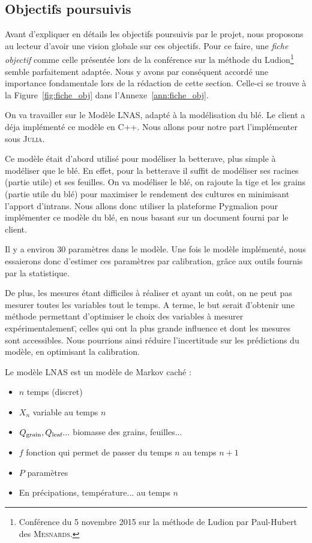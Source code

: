 \subsection{Objectifs poursuivis}

Avant d'expliquer en détails les objectifs poursuivis par le projet,
nous proposons au lecteur d'avoir une vision globale sur ces objectifs.
Pour ce faire, une \emph{fiche objectif} comme celle présentée 
lors de la conférence sur 
la méthode du Ludion\footnote{Conférence du 5 novembre 2015 
sur la méthode de Ludion par Paul-Hubert des \textsc{Mesnards}.} 
semble parfaitement adaptée.
Nous y avons par conséquent accordé une importance fondamentale
lors de la rédaction de cette section.
Celle-ci se trouve à la Figure~\ref{fig:fiche_obj} 
dans l'Annexe~\ref{ann:fiche_obj}.


On va travailler sur le Modèle LNAS, adapté à la modélisation du blé. 
Le client a déja implémenté ce modèle en C++. 
Nous allons pour notre part l'implémenter sous \textsc{Julia}.

Ce modèle était d'abord utilisé pour modéliser la betterave, 
plus simple à modéliser que le blé. 
En effet, pour la betterave il suffit de modéliser 
ses racines (partie utile) et ses feuilles.
On va modéliser le blé, on rajoute la tige et les grains (partie utile du blé)
pour maximiser le rendement des cultures en minimisant l’apport d’intrans.
Nous allons donc utiliser la plateforme Pygmalion 
pour implémenter ce modèle du blé,
en nous basant sur un document fourni par le client.

Il y a environ 30 paramètres dans le modèle. Une fois le modèle implémenté, nous essaierons donc d'estimer ces paramètres par calibration, grâce aux outils fournis par la statistique.

De plus, les mesures étant difficiles à réaliser et ayant un coût, on ne peut pas mesurer toutes les variables tout le temps. A terme, le but serait \"d'obtenir une méthode permettant d'optimiser le choix des variables à mesurer expérimentalement\", celles qui ont la plus grande influence et dont les mesures sont accessibles. Nous pourrions ainsi réduire l'incertitude sur les prédictions du modèle, en optimisant la calibration.

Le modèle LNAS est un modèle de Markov caché : 
\begin{itemize}
  \item $n$  temps (discret)     
  \item $X_n$ variable au temps $n$       
  \item $Q_{\text{grain}}, Q_{\text{leaf}}... $ biomasse des grains, feuilles...      
  \item $f$ fonction qui permet de passer du temps $n$ au temps $n+1$     
  \item $P$ paramètres      
  \item En précipations, température... au temps $n$
\end{itemize}

